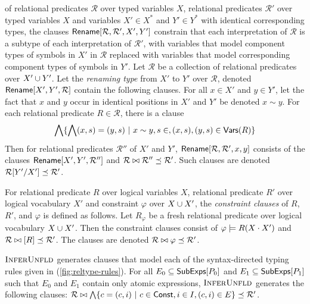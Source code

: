 %
of relational predicates $\mathcal{R}$ over typed variables $X$,
relational predicates $\mathcal{R}'$ over typed variables $X$ and
variables $X' \in X^{*}$ and $Y' \in Y^{*}$ with identical
corresponding types, the clauses $\renamesub{ \mathcal{R} }{
  \mathcal{R'} }{ X' }{ Y' }$ constrain that each interpretation of
$\mathcal{R}$ is a subtype of each interpretation of $\mathcal{R}'$,
with variables that model component types of symbols in $X'$ in
$\mathcal{R}$ replaced with variables that model corresponding
component types of symbols in $Y'$.
%
Let $\mathcal{R}$ be a collection of relational predicates over $X'
\union Y'$.
%
Let the \emph{renaming type} from $X'$ to $Y'$ over $\mathcal{R}$,
denoted $\renameclauses{ X' }{ Y' }{ \mathcal{R} }$ contain the
following clauses.
%
For all $x \in X'$ and $y \in Y'$, let the fact that $x$ and $y$ occur
in identical positions in $X'$ and $Y'$ be denoted $x \sim y$.
%
For each relational predicate $R \in \mathcal{R}$, there is a clause 
%
\[ \bigland \setformer{ \bigland (x, s) = (y, s) }{ %
  x \sim y, s \in , (x, s), (y, s) \in \vars(R)}
\]
%
Then for relational predicates $\mathcal{R}''$ of $X'$ and $Y'$,
$\renamesub{ \mathcal{R} }{ \mathcal{R}' }{ x }{ y }$ consists of the
clauses $\renameclauses{X'}{Y'}{ \mathcal{R}''}$ and $\mathcal{R}
\joinctr \mathcal{R}'' \subtype \mathcal{R}'$.
%
Such clauses are denoted $\replace{ \mathcal{R} }{ X' }{ Y' } \subtype
\mathcal{R}'$.

For relational predicate $R$ over logical variables $X$, %
relational predicate $R'$ over logical vocabulary $X'$ and constraint
$\varphi$ over $X \union X'$, the \emph{constraint clauses} of $R$,
$R'$, and $\varphi$ is defined as follows.
%
Let $R_{\varphi}$ be a fresh relational predicate over logical
vocabulary $X \union X'$.
%
Then the constraint clauses consist of
$\varphi \entails R(X \concat X')$ and %
$\mathcal{R} \joinctr [ R ] \subtype \mathcal{R}'$.
%
The clauses are denoted $\ctrclause{ \mathcal{R} }{ \varphi }{
  \mathcal{R}' }$.

$\verifybnd$ generates clauses that model each of the syntax-directed
typing rules given in (\autoref{fig:reltype-rules}).
%
For all $E_0 \subseteq \subexps{ P_0 }$ and $E_1 \subseteq \subexps{
  P_1 }$ such that $E_0$ and $E_1$ contain only atomic expressions,
$\verifybnd$ generates the following clauses:
%
$\mathcal{R} \joinctr %
\bigland \setformer{ c = (c, i) }{ c \in \const, i \in I, (c, i) \in E
} \subtype \mathcal{R}'$.

